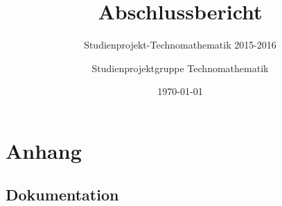 \documentclass[12pt,a4paper, oneside,ngerman]{scrartcl}
\title{Abschlussbericht}
\subtitle{Studienprojekt-Technomathematik 2015-2016}
\author{Studienprojektgruppe Technomathematik}
\date{\today}
\begin{document}
\maketitle
\newpage
\tableofcontents
\newpage





%

\section{Anhang}

\subsection{Dokumentation}

\end{document}
